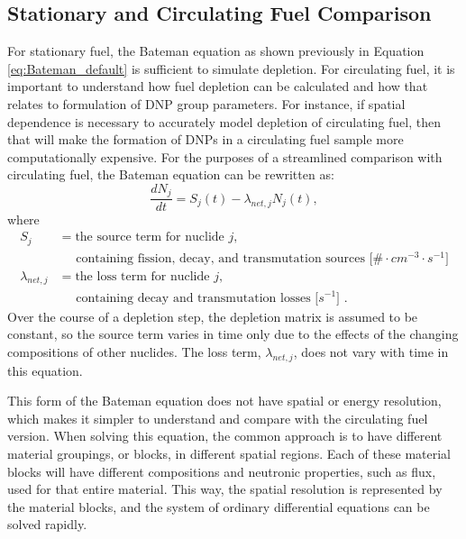 \subsection{Stationary and Circulating Fuel Comparison}
\label{sec:bateman}

For stationary fuel, the Bateman equation as shown previously in Equation \eqref{eq:Bateman_default} is sufficient to simulate depletion.
For circulating fuel, it is important to understand how fuel depletion can be calculated and how that relates to formulation of \gls{DNP} group parameters.
For instance, if spatial dependence is necessary to accurately model depletion of circulating fuel, then that will make the formation of \glspl{DNP} in a circulating fuel sample more computationally expensive. 
For the purposes of a streamlined comparison with circulating fuel, the Bateman equation can be rewritten as:
\begin{equation}
    \frac{dN_j}{dt} = S_j(t) - \lambda_{net, j} N_j(t),
    \label{eq:bate-stat-simple}
\end{equation}
where
\begin{align}
S_j &= \text{the source term for nuclide $j$, } \nonumber\\
& \;\;\;\;\; \text{containing fission, decay, and transmutation sources [$\# \cdot cm^{-3} \cdot s^{-1}$]} \nonumber \\
\lambda_{net, j} &= \text{the loss term for nuclide $j$,} \nonumber\\
& \;\;\;\;\; \text{containing decay and transmutation losses [$s^{-1}$] .} \nonumber
\end{align}
Over the course of a depletion step, the depletion matrix is assumed to be constant, so the source term varies in time only due to the effects of the changing compositions of other nuclides.
The loss term, $\lambda_{net, j}$, does not vary with time in this equation.




This form of the Bateman equation does not have spatial or energy resolution, which makes it simpler to understand and compare with the circulating fuel version.
When solving this equation, the common approach is to have different material groupings, or blocks, in different spatial regions.
Each of these material blocks will have different compositions and neutronic properties, such as flux, used for that entire material.
This way, the spatial resolution is represented by the material blocks, and the system of ordinary differential equations can be solved rapidly.

